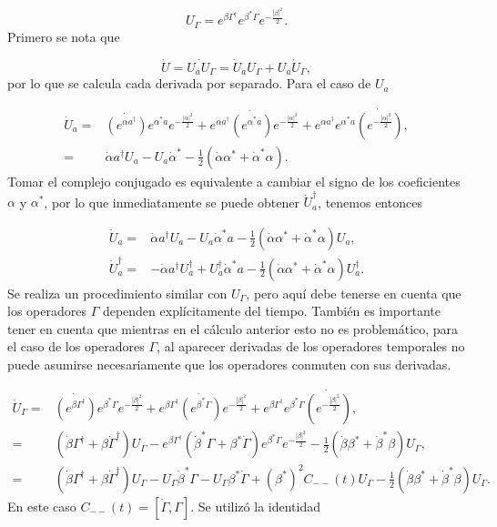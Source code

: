 \documentclass[a4paper,10pt]{report}
\begin{document}
\begin{equation}
U_\Gamma = e^{\beta \Gamma^\dagger}e^{\beta^* \Gamma}e^{-\frac{|\beta|^2}{2}}.
\end{equation} Primero se nota que

\begin{equation}
\dot{U} = \dot{U_aU_\Gamma} = \dot{U}_a U_\Gamma +  U_a \dot{U}_\Gamma,
\end{equation} por lo que se calcula cada derivada por separado. Para el caso de $U_a$

\begin{align*}
\dot{U}_a =& \dot{(e^{\alpha a^\dagger})}e^{\alpha^* a}e^{-\frac{|\alpha|^2}{2}}
+e^{\alpha a^\dagger}\dot{(e^{\alpha^* a})}e^{-\frac{|\alpha|^2}{2}}+e^{\alpha a^\dagger}e^{\alpha^* a}\dot{(e^{-\frac{|\alpha|^2}{2}})},\\
=&\dot{\alpha} a^\dagger U_a - U_a\dot{\alpha}^* - \frac{1}{2}(\dot{\alpha} \alpha^*+\dot{\alpha}^* \alpha).
\end{align*} Tomar el complejo conjugado es equivalente a cambiar el signo de los coeficientes $\alpha$ y $\alpha^*$, por lo que inmediatamente se puede obtener $\dot{U}_a^\dagger$, tenemos entonces

\begin{align}
\dot{U}_a=&\dot{\alpha} a^\dagger U_a - U_a\dot{\alpha}^*a - \frac{1}{2}(\dot{\alpha} \alpha^*+\dot{\alpha}^* \alpha)U_a,\\
\dot{U}_a^\dagger=&-\dot{\alpha} a^\dagger U_a^\dagger + U_a^\dagger\dot{\alpha}^*a - \frac{1}{2}(\dot{\alpha} \alpha^*+\dot{\alpha}^* \alpha)U_a^\dagger.
\end{align} Se realiza un procedimiento similar con $U_\Gamma$, pero aquí debe tenerse en cuenta que los operadores $\Gamma$ dependen explícitamente del tiempo. También es importante tener en cuenta que mientras en el cálculo anterior esto no es problemático, para el caso de los operadores $\Gamma$, al aparecer derivadas de los operadores temporales no puede asumirse necesariamente que los operadores conmuten con sus derivadas. 

\begin{align*}
\dot{U}_\Gamma =& \dot{(e^{\beta \Gamma^\dagger})}e^{\beta^* \Gamma}e^{-\frac{|\beta|^2}{2}}
+e^{\beta \Gamma^\dagger}\dot{(e^{\beta^* \Gamma})}e^{-\frac{|\beta|^2}{2}}+e^{\beta \Gamma^\dagger}e^{\beta^* \Gamma}\dot{(e^{-\frac{|\beta|^2}{2}})},\\
=&(\dot{\beta}\Gamma^\dagger +\beta \dot{\Gamma}^\dagger)U_\Gamma -e^{\beta \Gamma^\dagger}(\dot{\beta}^*\Gamma +\beta^* \dot{\Gamma})e^{\beta^* \Gamma}e^{-\frac{|\beta|^2}{2}} -\frac{1}{2}(\dot{\beta} \beta^*+\dot{\beta}^* \beta)U_\Gamma,\\
=&(\dot{\beta}\Gamma^\dagger +\beta \dot{\Gamma}^\dagger)U_\Gamma - U_\Gamma\dot{\beta}^*\Gamma-U_\Gamma\beta^* \dot{\Gamma} + (\beta^*)^2 C_{--}(t)U_\Gamma-\frac{1}{2}(\dot{\beta} \beta^*+\dot{\beta}^* \beta)U_\Gamma.
\end{align*} En este caso $C_{--}(t)=[\dot{\Gamma},\Gamma]$. Se utilizó la identidad
\end{document}
